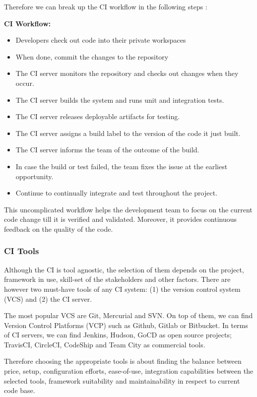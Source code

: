 Therefore we can break up the CI workflow in the following steps \cite{Fowler2006}:

\textbf{CI Workflow:}

\begin{itemize}
\item Developers check out code into their private workspaces
\item When done, commit the changes to the repository
\item The CI server monitors the repository and checks out changes when they occur.
\item The CI server builds the system and runs unit and integration tests.
\item The CI server releases deployable artifacts for testing.
\item The CI server assigns a build label to the version of the code it just built.
\item The CI server informs the team of the outcome of the build.
\item In case the build or test failed, the team fixes the issue at the earliest opportunity.
\item Continue to continually integrate and test throughout the project.
\end{itemize}

This uncomplicated workflow helps the development team to focus on the current code change till it is verified and validated. Moreover, it provides continuous feedback on the quality of the code.

\subsubsection{CI Tools}

Although the CI is tool agnostic, the selection of them depends on the project, framework in use, skill-set of the stakeholders and other factors. There are however two must-have tools of any CI system: (1) the version control system (VCS) and (2) the CI server.

The most popular VCS are Git, Mercurial and SVN. On top of them, we can find Version Control Platforms (VCP) such as Github, Gitlab or Bitbucket. In terms of CI servers, we can find Jenkins, Hudson, GoCD as open source projects; TravisCI, CircleCI, CodeShip and Team City as commercial tools.

Therefore choosing the appropriate tools is about finding the balance between price, setup, configuration efforts, ease-of-use, integration capabilities between the selected tools, framework suitability and maintainability in respect to current code base.

